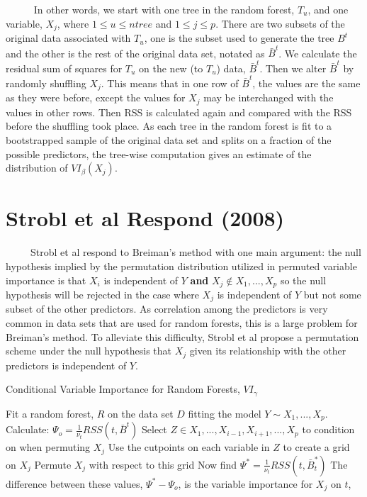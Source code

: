 \documentclass[12pt,twoside]{reedthesis}
\begin{document}
  ~~~~~ In other words, we start with one tree in the random forest,
  \(T_u\), and one variable, \(X_j\), where \(1 \leq u \leq ntree\) and
  \(1 \leq j \leq p\). There are two subsets of the original data
  associated with \(T_u\), one is the subset used to generate the tree
  \({B}^t\) and the other is the rest of the original data set, notated as
  \(\bar{B}^t\). We calculate the residual sum of squares for \(T_u\) on
  the new (to \(T_u\)) data, \(\bar{B}^t\). Then we alter \(\bar{B}^t\) by
  randomly shuffling \(X_j\). This means that in one row of \(\bar{B}^t\),
  the values are the same as they were before, except the values for
  \(X_j\) may be interchanged with the values in other rows. Then RSS is
  calculated again and compared with the RSS before the shuffling took
  place. As each tree in the random forest is fit to a bootstrapped sample
  of the original data set and splits on a fraction of the possible
  predictors, the tree-wise computation gives an estimate of the
  distribution of \(VI_{\beta}(X_j)\).
  
  \section{Strobl et al Respond (2008)}\label{strobl-et-al-respond-2008}
  
  ~~~~~Strobl et al respond to Breiman's method with one main argument:
  the null hypothesis implied by the permutation distribution utilized in
  permuted variable importance is that \(X_i\) is independent of \(Y\)
  \textbf{and} \({X_j \notin X_1,...,X_p}\) so the null hypothesis will be
  rejected in the case where \(X_j\) is independent of \(Y\) but not some
  subset of the other predictors. As correlation among the predictors is
  very common in data sets that are used for random forests, this is a
  large problem for Breiman's method. To alleviate this difficulty, Strobl
  et al propose a permutation scheme under the null hypothesis that
  \(X_j\) given its relationship with the other predictors is independent
  of \(Y\).
  
  \begin{algorithm}
  \caption{Conditional Variable Importance for Random Forests, $VI_{\gamma}$}
  \label{strobl}
  \begin{algorithmic}[1]
  \State Fit a random forest, $R$ on the data set $D$ fitting the model $Y \sim X_1,...,X_p$.
  \State Calculate: $\Psi_o =  \frac 1 {\nu_t} RSS(t,\bar{B}^t)$
  \State Select $Z \in X_1,...,X_{i-1}, X_{i+1},...,X_p$ to condition on when permuting $X_j$
  \State Use the cutpoints on each variable in $Z$ to create a grid on $X_j$
  \State Permute $X_j$ with respect to this grid
  \State Now find $\Psi^* =  \frac 1 {\nu_t} RSS(t,\bar{B}_t^*)$
  \State The difference between these values, $\Psi^* - \Psi_o$,  is the variable importance for $X_j$ on $t$,  
  \EndFor
  \EndFor
  \end{algorithmic}
  \end{algorithm}
  
\end{document}
